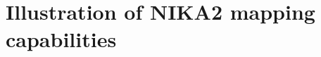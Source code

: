 \documentclass[]{aa} %
\begin{document}

\section{Illustration of NIKA2 mapping capabilities}
\label{Illustration of NIKA2 mapping capabilities}
\end{document}
